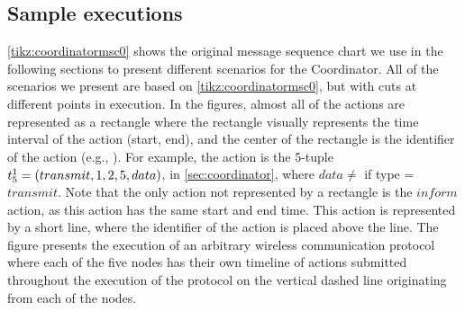 
\subsection{Sample executions}\label{sec:coordinator-examples}

\autoref{tikz:coordinatormsc0} shows the original message sequence chart we use in the following sections to present different scenarios for the Coordinator. All of the scenarios we present are based on \autoref{tikz:coordinatormsc0}, but with cuts at different points in execution. In the figures, almost all of the actions are represented as a rectangle where the rectangle visually represents the time interval of the action (start, end), and the center of the rectangle is the identifier of the action (e.g., ). For example, the action  is the 5-tuple $t^{1}_{5} = (transmit, 1, 2, 5, data)$, in \autoref{sec:coordinator}, where $data \neq$ \KwNull if type = $transmit$. Note that the only action not represented by a rectangle is the $inform$ action, as this action has the same start and end time. This action is represented by a short line, where the identifier of the action is placed above the line. The figure presents the execution of an arbitrary wireless communication protocol where each of the five nodes has their own timeline of actions submitted throughout the execution of the protocol on the vertical dashed line originating from each of the nodes. \medbreak

